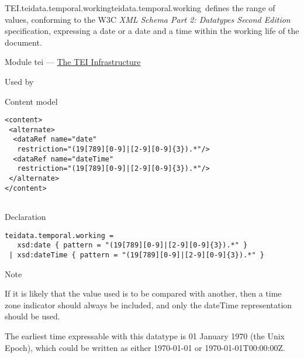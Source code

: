 \begin{reflist}
\item[]\begin{specHead}{TEI.teidata.temporal.working}{teidata.temporal.working} defines the range of values, conforming to the W3C \textit{XML Schema Part 2: Datatypes Second Edition} specification, expressing a date or a date and a time within the working life of the document.\end{specHead} 
    \item[{Module}]
  tei — \hyperref[ST]{The TEI Infrastructure}
    \item[{Used by}]
  
    \item[{Content model}]
  \mbox{}\hfill\\[-10pt]\begin{Verbatim}[fontsize=\small]
<content>
 <alternate>
  <dataRef name="date"
   restriction="(19[789][0-9]|[2-9][0-9]{3}).*"/>
  <dataRef name="dateTime"
   restriction="(19[789][0-9]|[2-9][0-9]{3}).*"/>
 </alternate>
</content>
    
\end{Verbatim}

    \item[{Declaration}]
  \mbox{}\hfill\\[-10pt]\begin{Verbatim}[fontsize=\small]
teidata.temporal.working =
   xsd:date { pattern = "(19[789][0-9]|[2-9][0-9]{3}).*" }
 | xsd:dateTime { pattern = "(19[789][0-9]|[2-9][0-9]{3}).*" }
\end{Verbatim}

    \item[{Note}]
  \par
If it is likely that the value used is to be compared with another, then a time zone indicator should always be included, and only the dateTime representation should be used.\par
The earliest time expressable with this datatype is 01 January 1970 (the Unix Epoch), which could be written as either 1970-01-01 or 1970-01-01T00:00:00Z.
\end{reflist}  
